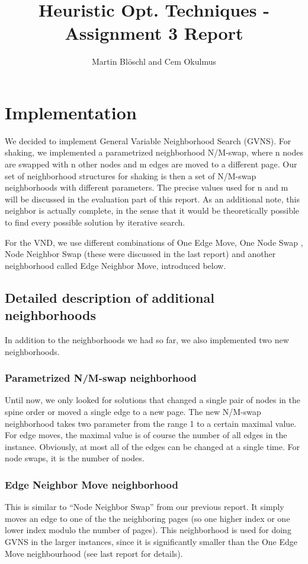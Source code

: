 \documentclass [11pt]{article}
\begin{document}
\title{ Heuristic Opt. Techniques - Assignment 3 Report}
\author{ Martin Blöschl and Cem Okulmus }

\maketitle
\thispagestyle{empty}


\section{Implementation}
We decided to implement General Variable Neighborhood Search (GVNS). For shaking, we implemented a parametrized neighborhood N/M-swap, where n nodes are swapped with n other nodes and m edges are moved to a different page. Our set of neighborhood structures for shaking is then a set of N/M-swap neighborhoods with different parameters. The precise values used for n and m will be discussed in the evaluation part of this report. As an additional note, this neighbor is actually complete, in the sense that it would be theoretically possible to find every possible solution by iterative search. 

For the VND, we use different combinations of One Edge Move, One Node Swap , Node Neighbor Swap (these were discussed in the last report) and another neighborhood called Edge Neighbor Move, introduced below.

\subsection{Detailed description of additional neighborhoods}
In addition to the neighborhoods we had so far, we also implemented two new neighborhoods.

\subsubsection{Parametrized N/M-swap neighborhood}
Until now, we only looked for solutions that changed a single pair of nodes in the spine order or moved a single edge to a new page. The new N/M-swap neighborhood takes two parameter from the range 1 to a certain maximal value. For edge moves, the maximal value is of course the number of all edges in the instance. Obviously, at most all of the edges can be changed at a single time.  For node swaps, it is the number of nodes.


\subsubsection{Edge Neighbor Move neighborhood}
This is similar to ``Node Neighbor Swap'' from our previous report. It simply moves an edge to one of the the neighboring pages (so one higher index or one lower index modulo the number of pages). This neighborhood is used for doing GVNS in the larger instances, since it is significantly smaller than the One Edge Move neighbourhood (see last report for details). 
\end{document}
